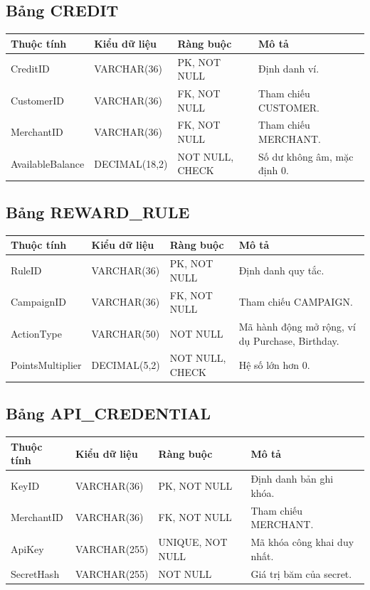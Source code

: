 \subsection{Bảng CREDIT}
\begin{table}[H]
\centering
\small
\begin{tabular}{|p{3cm}|p{3cm}|p{2.5cm}|p{5cm}|}
\hline
Thuộc tính & Kiểu dữ liệu & Ràng buộc & Mô tả \\ \hline
CreditID & VARCHAR(36) & PK, NOT NULL & Định danh ví. \\ \hline
CustomerID & VARCHAR(36) & FK, NOT NULL & Tham chiếu CUSTOMER. \\ \hline
MerchantID & VARCHAR(36) & FK, NOT NULL & Tham chiếu MERCHANT. \\ \hline
AvailableBalance & DECIMAL(18,2) & NOT NULL, CHECK & Số dư không âm, mặc định 0. \\ \hline
\end{tabular}
\end{table}
\subsection{Bảng REWARD\_RULE}
\begin{table}[H]
\centering
\small
\begin{tabular}{|p{3cm}|p{3cm}|p{2.5cm}|p{5cm}|}
\hline
Thuộc tính & Kiểu dữ liệu & Ràng buộc & Mô tả \\ \hline
RuleID & VARCHAR(36) & PK, NOT NULL & Định danh quy tắc. \\ \hline
CampaignID & VARCHAR(36) & FK, NOT NULL & Tham chiếu CAMPAIGN. \\ \hline
ActionType & VARCHAR(50) & NOT NULL & Mã hành động mở rộng, ví dụ Purchase, Birthday. \\ \hline
PointsMultiplier & DECIMAL(5,2) & NOT NULL, CHECK & Hệ số lớn hơn 0. \\ \hline
\end{tabular}
\end{table}
\subsection{Bảng API\_CREDENTIAL}
\begin{table}[H]
\centering
\small
\begin{tabular}{|p{3cm}|p{3cm}|p{2.5cm}|p{5cm}|}
\hline
Thuộc tính & Kiểu dữ liệu & Ràng buộc & Mô tả \\ \hline
KeyID & VARCHAR(36) & PK, NOT NULL & Định danh bản ghi khóa. \\ \hline
MerchantID & VARCHAR(36) & FK, NOT NULL & Tham chiếu MERCHANT. \\ \hline
ApiKey & VARCHAR(255) & UNIQUE, NOT NULL & Mã khóa công khai duy nhất. \\ \hline
SecretHash & VARCHAR(255) & NOT NULL & Giá trị băm của secret. \\ \hline
\end{tabular}
\end{table}

